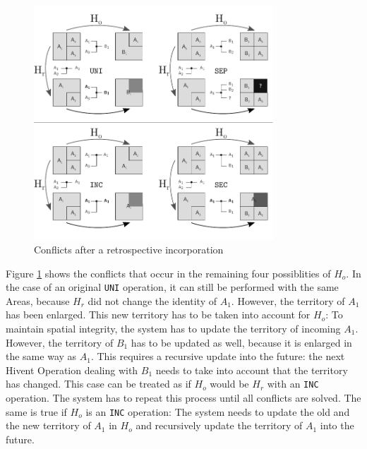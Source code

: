 \begin{figure}[ht]
\vspace{1em}
  \centering
  \includegraphics[width=0.8\textwidth]{graphics/development/update_conflict/INC}
  \caption{Conflicts after a retrospective incorporation}
  \label{fig:update_conflict_INC}
\end{figure}

Figure \ref{fig:update_conflict_INC} shows the conflicts that occur in the remaining four possiblities of $H_o$. In the case of an original \texttt{UNI} operation, it can still be performed with the same Areas, because $H_r$ did not change the identity of $A_1$. However, the territory of $A_1$ has been enlarged. This new territory has to be taken into account for $H_o$: To maintain spatial integrity, the system has to update the territory of incoming $A_1$. However, the territory of $B_1$ has to be updated as well, because it is enlarged in the same way as $A_1$. This requires a recursive update into the future: the next Hivent Operation dealing with $B_1$ needs to take into account that the territory has changed. This case can be treated as if $H_o$ would be $H_r$ with an \texttt{INC} operation. The system has to repeat this process until all conflicts are solved. The same is true if $H_o$ is an \texttt{INC} operation: The system needs to update the old and the new territory of $A_1$ in $H_o$ and recursively update the territory of $A_1$ into the future.

